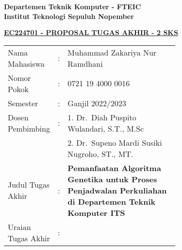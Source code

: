 \begin{flushleft}
  \textbf{Departemen Teknik Komputer - FTEIC}\\
  \textbf{Institut Teknologi Sepuluh Nopember}\\
\end{flushleft}

\begin{center}
  \underline{\textbf{EC224701 - PROPOSAL TUGAS AKHIR - 2 SKS}}
\end{center}

\begin{adjustwidth}{-0.2cm}{}
  \begin{tabular}{lcp{0.7\linewidth}}

    Nama Mahasiswa &:& Muhammad Zakariya Nur Ramdhani \\
    Nomor Pokok &:& 0721 19 4000 0016 \\

    Semester &:& Ganjil 2022/2023 \\

    Dosen Pembimbing &:& 1. Dr.\ Diah Puspito Wulandari, S.T., M.Sc \\
    & & 2. Dr.\ Supeno Mardi Susiki Nugroho, ST., MT. \\

    Judul Tugas Akhir &:& \textbf{Pemanfaatan Algoritma Genetika untuk Proses Penjadwalan Perkuliahan di Departemen Teknik Komputer ITS} \\

    Uraian Tugas Akhir &:& \\
  \end{tabular}
\end{adjustwidth}


